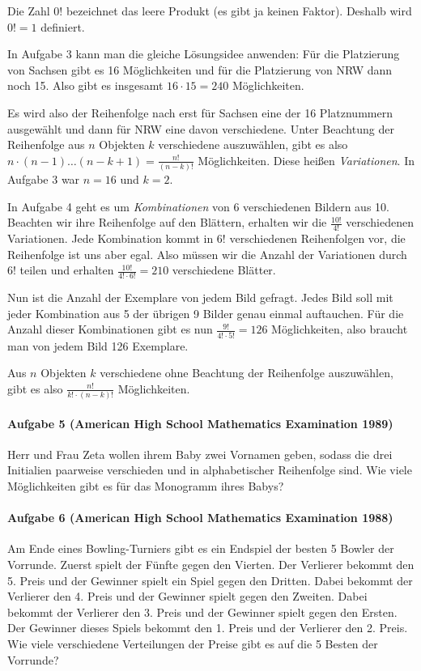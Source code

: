 \documentclass[11pt,a4paper]{article}
\begin{document}
Die Zahl $0!$ bezeichnet das leere Produkt (es gibt ja keinen Faktor). Deshalb
wird $0!=1$ definiert.

In Aufgabe 3 kann man die gleiche Lösungsidee anwenden: Für die Platzierung
von Sachsen gibt es 16 Möglichkeiten und für die Platzierung von NRW dann noch
15.  Also gibt es insgesamt $16 \cdot 15=240$ Möglichkeiten.

Es wird also der Reihenfolge nach erst für Sachsen eine der 16 Platznummern
ausgewählt und dann für NRW eine davon verschiedene. Unter Beachtung der
Reihenfolge aus $n$ Objekten $k$ verschiedene auszuwählen, gibt es also
$n\cdot (n-1)\dots (n-k+1)=\frac{n!}{(n-k)!}$ Möglichkeiten. Diese heißen
\textit{Variationen}. In Aufgabe 3 war $n=16$ und $k=2$.

In Aufgabe 4 geht es um \textit{Kombinationen} von 6 verschiedenen Bildern aus
10. Beachten wir ihre Reihenfolge auf den Blättern, erhalten wir die
$\frac{10!}{4!}$ verschiedenen Variationen. Jede Kombination kommt in $6!$
verschiedenen Reihenfolgen vor, die Reihenfolge ist uns aber egal. Also müssen
wir die Anzahl der Variationen durch $6!$ teilen und erhalten
$\frac{10!}{4!\cdot 6!}=210$ verschiedene Blätter.

Nun ist die Anzahl der Exemplare von jedem Bild gefragt. Jedes Bild soll mit
jeder Kombination aus 5 der übrigen 9 Bilder genau einmal auftauchen. Für die
Anzahl dieser Kombinationen gibt es nun $\frac{9!}{4!\cdot 5!}=126$
Möglichkeiten, also braucht man von jedem Bild 126 Exemplare.

Aus $n$ Objekten $k$ verschiedene ohne Beachtung der Reihenfolge auszuwählen,
gibt es also $\frac{n!}{k!\cdot (n-k)!}$ Möglichkeiten.

\paragraph{Aufgabe 5 (American High School Mathematics Examination 1989)} 
Herr und Frau Zeta wollen ihrem Baby zwei Vornamen geben, sodass die drei
Initialien paarweise verschieden und in alphabetischer Reihenfolge sind. Wie
viele Möglichkeiten gibt es für das Monogramm ihres Babys?

\paragraph{Aufgabe 6 (American High School Mathematics Examination 1988)} 
Am Ende eines Bowling-Turniers gibt es ein Endspiel der besten 5 Bowler der
Vorrunde. Zuerst spielt der Fünfte gegen den Vierten. Der Verlierer bekommt
den 5. Preis und der Gewinner spielt ein Spiel gegen den Dritten. Dabei
bekommt der Verlierer den 4. Preis und der Gewinner spielt gegen den
Zweiten. Dabei bekommt der Verlierer den 3. Preis und der Gewinner spielt
gegen den Ersten. Der Gewinner dieses Spiels bekommt den 1. Preis und der
Verlierer den 2. Preis. Wie viele verschiedene Verteilungen der Preise gibt es
auf die 5 Besten der Vorrunde?
\end{document}
